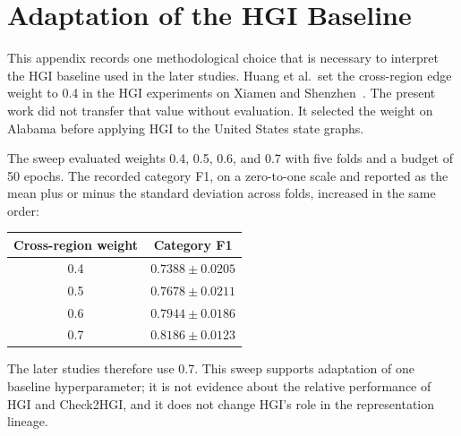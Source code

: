 
\chapter{Adaptation of the HGI Baseline}
\label{apx:hgi-tuning}

This appendix records one methodological choice that is necessary to interpret the
HGI baseline used in the later studies. Huang et al.\ set the cross-region edge weight
to 0.4 in the HGI experiments on Xiamen and Shenzhen~\cite{huang2023hgi}. The present
work did not transfer that value without evaluation. It selected the weight on Alabama
before applying HGI to the United States state graphs.

The sweep evaluated weights 0.4, 0.5, 0.6, and 0.7 with five folds and a budget of 50
epochs. The recorded category F1, on a zero-to-one scale and reported as the mean plus
or minus the standard deviation across folds, increased in the same order:

\begin{center}
\begin{tabular}{cc}
  \toprule
  Cross-region weight & Category F1 \\
  \midrule
  0.4 & $0.7388 \pm 0.0205$ \\
  0.5 & $0.7678 \pm 0.0211$ \\
  0.6 & $0.7944 \pm 0.0186$ \\
  0.7 & $0.8186 \pm 0.0123$ \\
  \bottomrule
\end{tabular}
\end{center}

The later studies therefore use 0.7. This sweep supports adaptation of one baseline
hyperparameter; it is not evidence about the relative performance of HGI and
Check2HGI, and it does not change HGI's role in the representation lineage.
